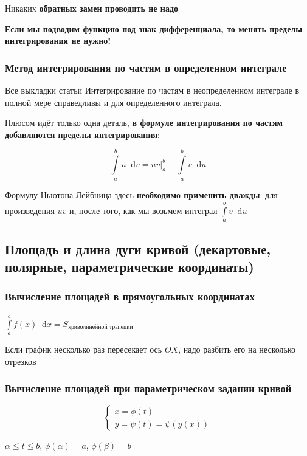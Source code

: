 \documentclass{article}
\newcommand*\diff{\mathop{}\!\mathrm{d}}
\begin{document}
Никаких \textbf{обратных замен проводить не надо}

\hfill

\textbf{Если мы подводим функцию под знак дифференциала, то менять пределы интегрирования не нужно!
}
\subsubsection{Метод интегрирования по частям в определенном интеграле}

Все выкладки статьи Интегрирование по частям в неопределенном интеграле в полной мере справедливы и для определенного интеграла.

Плюсом идёт только одна деталь, \textbf{в формуле интегрирования по частям добавляются пределы интегрирования}:

$$\int\limits_{a}^{b} u \diff v = u v \bigg|_{a}^{b} - \int\limits_{a}^{b} v \diff u$$

Формулу Ньютона-Лейбница здесь \textbf{необходимо применить дважды}: для произведения $u v$ и, после того, как мы возьмем интеграл $\int\limits_{a}^{b} v \diff u$

\pagebreak
\subsection{Площадь и длина дуги кривой (декартовые, полярные, параметрические координаты)}

\subsubsection{Вычисление площадей в прямоугольных координатах}

$\int\limits_{a}^{b} f(x) \diff x = S_{\text{криволинейной трапеции}}$

Если график несколько раз пересекает ось $OX$, надо разбить его на несколько отрезков

\subsubsection{Вычисление площадей при параметрическом задании кривой}

\begin{equation}
\begin{cases}
    x = \phi(t) \\
    y = \psi(t) = \psi(y(x))
\end{cases}
\end{equation}

$\alpha \le t \le b$, $\phi(\alpha) = a$, $\phi(\beta) = b$
\end{document}
